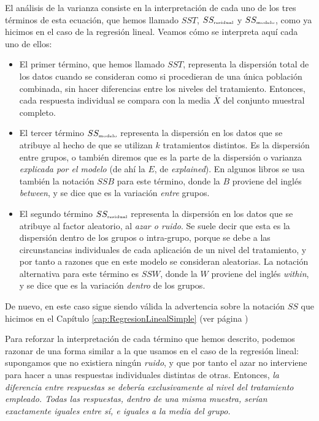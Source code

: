 El análisis de la varianza consiste en la interpretación de cada uno de los tres términos de esta
ecuación, que hemos llamado $SST$, $SS_{\mbox{\tiny residual}}$ y $SS_{\mbox{\tiny modelo}}$,  como
ya hicimos en el caso de la regresión lineal. Veamos cómo se interpreta aquí cada uno de ellos:
        \begin{itemize}
        \item El primer término, que hemos llamado $SST$,  representa la dispersión total de los datos cuando se consideran como si procedieran de una única población combinada, sin hacer diferencias entre los niveles del tratamiento. Entonces, cada respuesta individual se compara con la media $\bar X$ del conjunto muestral completo.
        \item El tercer término $SS_{\mbox{\tiny modelo}}$ representa la dispersión en los datos
            que se atribuye al hecho de que se utilizan $k$ tratamientos distintos. Es la {\sf
            dispersión entre grupos}, o también diremos que
            es la parte de la dispersión o varianza {\em explicada por el modelo} (de ahí la $E$,
            de {\em explained}). En algunos libros se usa también la notación $SSB$ para este
            término, donde la $B$ proviene del inglés {\em between}, y se dice que es la variación {\em
            entre} grupos.
        \item El segundo término $SS_{\mbox{\tiny residual}}$ representa la dispersión en los
            datos que se atribuye al factor aleatorio, al {\em azar o ruido}. Se suele decir que
            esta es la  {\sf dispersión dentro de los grupos} o intra-grupo, porque se debe a las circunstancias
            individuales de cada aplicación de un nivel del tratamiento, y por tanto a razones
            que en este modelo se consideran aleatorias. La notación alternativa para este
            término es $SSW$, donde la $W$ proviene del inglés {\em within}, y se dice que es la
            variación {\em dentro} de los grupos.
        \end{itemize}
De nuevo, en este caso sigue siendo válida la advertencia sobre la notación $SS$ que  hicimos en el Capítulo \ref{cap:RegresionLinealSimple} (ver página \pageref{cap10:parag:AdvertenciaSSE})


Para reforzar la interpretación de cada término que hemos descrito, podemos razonar de una forma similar a la que usamos en el caso de la regresión lineal: supongamos que no existiera ningún {\em ruido}, y que por tanto el azar no interviene para hacer a unas respuestas individuales distintas de otras. Entonces, {\em la diferencia entre respuestas se debería exclusivamente al nivel del tratamiento empleado. Todas las respuestas, dentro de una misma muestra, serían exactamente iguales entre sí, e iguales a la media del grupo.}


